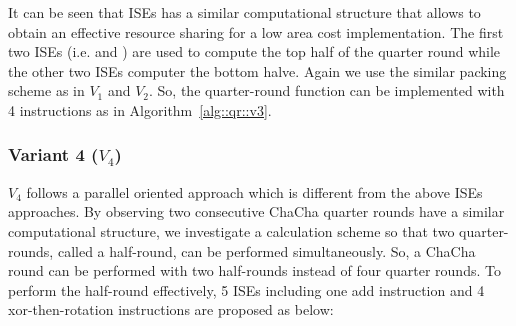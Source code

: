 It can be seen that ISEs has a similar computational structure that allows to obtain an effective resource sharing for a low area cost implementation.
The first two ISEs (i.e.  and ) are used to compute the top half of the quarter round while the other two ISEs computer the bottom halve.
Again we use the similar packing scheme as in $V_1$ and $V_2$. So, the quarter-round function can be implemented with 4 instructions as in Algorithm~\ref{alg::qr::v3}.

\subsubsection{Variant 4 ($V_4$)}
$V_4$ follows a parallel oriented approach which is different from the above ISEs approaches. By observing two consecutive ChaCha quarter rounds have a similar computational structure, we investigate a calculation scheme so that two quarter-rounds, called a half-round, can be performed simultaneously. So, a ChaCha round can be performed with two half-rounds instead of four quarter rounds. To perform the half-round effectively, 5 ISEs including one add instruction and 4 xor-then-rotation instructions are proposed as below:   

